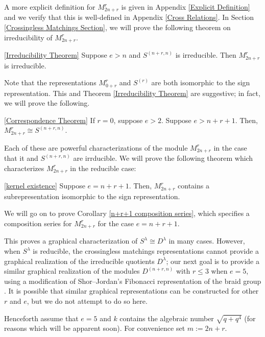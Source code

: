 \documentclass{amsart}
\def\thmcolor{black!60!orange}
\begin{document}
  A more explicit definition for $M_{2n + r}^r$ is given in Appendix \ref{Explicit Definition} and we verify that this is well-defined in Appendix \ref{Cross Relations}.
  In Section \ref{Crossingless Matchings Section}, we will prove the following theorem on irreducibility of $M_{2n + r}^r$.
  \begingroup
  \hypersetup{linkcolor=\thmcolor} %
  \begin{customthm}{\ref{Irreducibility Theorem}}
    Suppose $e > n$ and $S^{(n+r,n)}$ is irreducible.
    Then $M_{2n + r}^r$ is irreducible.
  \end{customthm}
  \endgroup
  Note that the representations $M_{0 + r}^r$ and $S^{(r)}$ are both isomorphic to the sign representation.
  This and Theorem \ref{Irreducibility Theorem} are suggestive;
  in fact, we will prove the following.
  \begingroup
  \hypersetup{linkcolor=\thmcolor}
  \begin{customthm}{\ref{Correspondence Theorem}}
    If $r = 0$, suppose $e > 2$.
    Suppose $e > n + r + 1$.
    Then, $M_{2n + r}^r \cong S^{(n+r,n)}$.
  \end{customthm}
  \endgroup
  Each of these are powerful characterizations of the module $M_{2n + r}^r$ in the case that it and $S^{(n+r,n)}$ are irrducible.
  We will prove the following theorem which characterizes $M_{2n + r}^r$ in the reducible case:
  \begingroup
  \hypersetup{linkcolor=\thmcolor}
  \begin{customthm}{\ref{kernel existence}}
    Suppose $e = n + r + 1$.
    Then, $M_{2n + r}^r$ contains a subrepresentation isomorphic to the sign representation. 
  \end{customthm}
  \endgroup
  We will go on to prove Corollary \ref{n+r+1 composition series}, which specifies a composition series for $M_{2n + r}^r$ for the case $e = n + r + 1$.

  This proves a graphical characterization of $S^\lambda \cong D^\lambda$ in many cases.
  However, when $S^\lambda$ is reducible, the crossingless matchings representations cannot provide a graphical realization of the irreducible quotients $D^\lambda$;
  our next goal is to provide a similar graphical realization of the modules $D^{(n+r,n)}$ with $r \leq 3$ when $e=5$, using a modification of Shor--Jordan's Fibonacci representation of the braid group \cite{Shor}.
  It is possible that similar graphical representations can be constructed for other $r$ and $e$, but we do not attempt to do so here.
  
  \def\vara{\alpha_1}
  \def\varb{\alpha_2}
  \def\varc{\varepsilon_1}
  \def\vard{\delta}
  \def\vare{\varepsilon_2}
  \def\vs{\texttt{*}}
  \def\vp{\texttt{0}}
  Henceforth assume that $e = 5$ and $k$ contains the algebraic number $\sqrt{q + q^4}$ (for reasons which will be apparent soon).
  For convenience set $m := 2n + r$.
  
\end{document}
